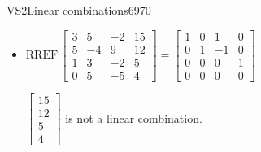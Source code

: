 \begin{exercise}{VS2}{Linear combinations}{6970}
\begin{exerciseAnswer}
\begin{itemize}
 
\item  

 \(
\mathrm{RREF}\, \left[\begin{array}{ccc|c}
3 & 5 & -2 & 15 \\
5 & -4 & 9 & 12 \\
1 & 3 & -2 & 5 \\
0 & 5 & -5 & 4
\end{array}\right] = \left[\begin{array}{ccc|c}
1 & 0 & 1 & 0 \\
0 & 1 & -1 & 0 \\
0 & 0 & 0 & 1 \\
0 & 0 & 0 & 0
\end{array}\right]
                        \) 

 

 \(\left[\begin{array}{c}
15 \\
12 \\
5 \\
4
\end{array}\right]\) is not a linear combination. 

 
\end{itemize}

     \end{exerciseAnswer}
 \end{exercise}


